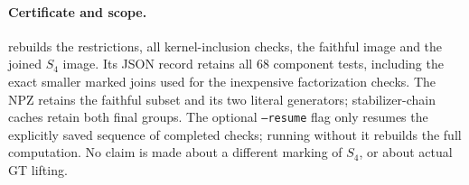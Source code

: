 \paragraph{Certificate and scope.}
rebuilds the restrictions, all kernel-inclusion
checks, the faithful image and the joined $S_4$
image.  Its JSON record retains all 68 component
tests, including the exact smaller marked joins
used for the inexpensive factorization checks.
The NPZ retains the faithful subset and its two
literal generators; stabilizer-chain caches retain
both final groups.
The optional \texttt{--resume} flag only resumes
the explicitly saved sequence of completed checks;
running without it rebuilds the full computation.
No claim is made about a different marking of
$S_4$, or about actual GT lifting.
